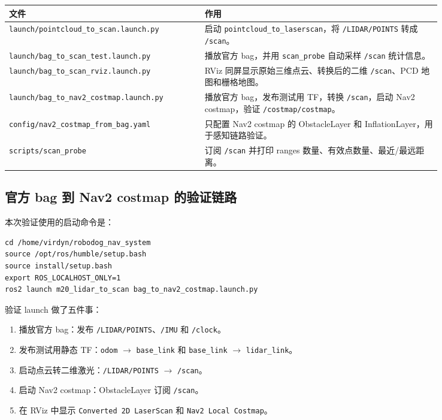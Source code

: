 \documentclass[UTF8,11pt,a4paper]{ctexart}
\begin{document}
\begin{center}
\renewcommand{\arraystretch}{1.25}
\begin{tabular}{p{0.38\linewidth}p{0.46\linewidth}}
\toprule
\textbf{文件} & \textbf{作用}\\
\midrule
\texttt{launch/pointcloud\_to\_scan.launch.py} &
启动 \texttt{pointcloud\_to\_laserscan}，将 \texttt{/LIDAR/POINTS} 转成 \texttt{/scan}。\\
\texttt{launch/bag\_to\_scan\_test.launch.py} &
播放官方 bag，并用 \texttt{scan\_probe} 自动采样 \texttt{/scan} 统计信息。\\
\texttt{launch/bag\_to\_scan\_rviz.launch.py} &
RViz 同屏显示原始三维点云、转换后的二维 \texttt{/scan}、PCD 地图和栅格地图。\\
\texttt{launch/bag\_to\_nav2\_costmap.launch.py} &
播放官方 bag，发布测试用 TF，转换 \texttt{/scan}，启动 Nav2 costmap，验证 \texttt{/costmap/costmap}。\\
\texttt{config/nav2\_costmap\_from\_bag.yaml} &
只配置 Nav2 costmap 的 ObstacleLayer 和 InflationLayer，用于感知链路验证。\\
\texttt{scripts/scan\_probe} &
订阅 \texttt{/scan} 并打印 ranges 数量、有效点数量、最近/最远距离。\\
\bottomrule
\end{tabular}
\end{center}

\subsection{官方 bag 到 Nav2 costmap 的验证链路}

本次验证使用的启动命令是：

\begin{verbatim}
cd /home/virdyn/robodog_nav_system
source /opt/ros/humble/setup.bash
source install/setup.bash
export ROS_LOCALHOST_ONLY=1
ros2 launch m20_lidar_to_scan bag_to_nav2_costmap.launch.py
\end{verbatim}

验证 launch 做了五件事：

\begin{enumerate}
  \item 播放官方 bag：发布 \texttt{/LIDAR/POINTS}、\texttt{/IMU} 和 \texttt{/clock}。
  \item 发布测试用静态 TF：\texttt{odom} \(\rightarrow\) \texttt{base\_link} 和 \texttt{base\_link} \(\rightarrow\) \texttt{lidar\_link}。
  \item 启动点云转二维激光：\texttt{/LIDAR/POINTS} \(\rightarrow\) \texttt{/scan}。
  \item 启动 Nav2 costmap：ObstacleLayer 订阅 \texttt{/scan}。
  \item 在 RViz 中显示 \texttt{Converted 2D LaserScan} 和 \texttt{Nav2 Local Costmap}。
\end{enumerate}
\end{document}
